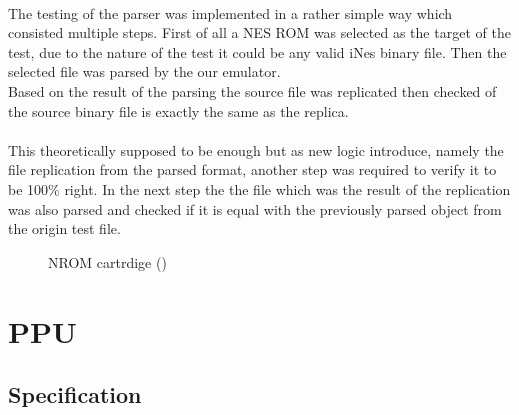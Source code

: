 \documentclass[]{report}
\begin{document}
\paragraph{ }
The testing of the parser was implemented in a rather simple way which consisted multiple steps.
First of all a NES ROM was selected as the target of the test, due to the nature of the test it could be any valid iNes binary file. Then the selected file was parsed by the our emulator. 
\\
Based on the result of the parsing the source file was replicated then checked of the source binary file is exactly the same as the replica. 
\paragraph{ }
This theoretically supposed to be enough but as new logic introduce, namely the file replication from the parsed format, another step was required to verify it to be 100\% right. In the next step the the file which was the result of the replication was also parsed and checked if it is equal with the previously parsed object from the origin test file.  

\begin{figure}[!htb]
	\caption{\label{fig:my-label} NROM cartrdige (\cite{ROM1})}
\end{figure}
\clearpage

\section{PPU}

\subsection{Specification}
\end{document}
